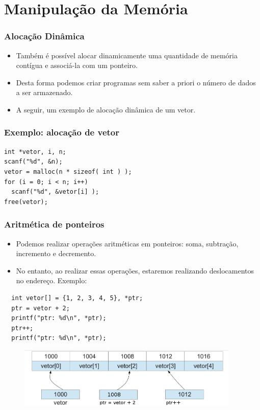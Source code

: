 \documentclass[aspectratio=169]{beamer}
\begin{document}
\section{Manipulação da Memória}

\begin{frame}
\frametitle{Alocação Dinâmica}
\begin{itemize}
\item Também é possível alocar dinamicamente uma quantidade de memória contígua e associá-la com um ponteiro.
\item Desta forma podemos criar programas sem saber a priori o número de dados a ser armazenado.
\item A seguir, um exemplo de alocação dinâmica de um vetor.
\end{itemize}
\end{frame}


\begin{frame}[fragile]
\frametitle{Exemplo: alocação de vetor}
\begin{lstlisting}
int *vetor, i, n;
scanf("%d", &n);
vetor = malloc(n * sizeof( int ) );
for (i = 0; i < n; i++)
  scanf("%d", &vetor[i] );
free(vetor);
\end{lstlisting} 
\end{frame}


\begin{frame}[fragile]
\frametitle{Aritmética de ponteiros}
\begin{itemize}
\item Podemos realizar operações aritméticas em ponteiros: soma, subtração, incremento e decremento.
\item No entanto, ao realizar essas operações, estaremos realizando deslocamentos no endereço. Exemplo:
\end{itemize}
\begin{lstlisting}
  int vetor[] = {1, 2, 3, 4, 5}, *ptr;
  ptr = vetor + 2;
  printf("ptr: %d\n", *ptr);
  ptr++;
  printf("ptr: %d\n", *ptr);
\end{lstlisting} 
\begin{figure}[!ht]
  \centering
  \includegraphics[width=300pt]{imgs/aritmetica_ponteiro.png}
\end{figure}
\end{frame}
\end{document}
